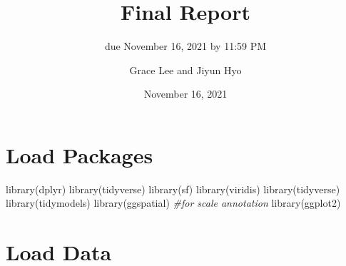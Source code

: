 \documentclass[
  11 pt,
]{article}
\title{Final Report}
\subtitle{due November 16, 2021 by 11:59 PM}
\author{Grace Lee and Jiyun Hyo}
\date{November 16, 2021}
\newenvironment{Shaded}{\begin{snugshade}}{\end{snugshade}}
\newcommand{\CommentTok}[1]{\textcolor[rgb]{0.56,0.35,0.01}{\textit{#1}}}
\newcommand{\FunctionTok}[1]{\textcolor[rgb]{0.00,0.00,0.00}{#1}}
\newcommand{\NormalTok}[1]{#1}
\begin{document}
\maketitle

\hypertarget{load-packages}{%
\section{Load Packages}\label{load-packages}}

\begin{Shaded}
\begin{Highlighting}[]
\FunctionTok{library}\NormalTok{(dplyr)}
\FunctionTok{library}\NormalTok{(tidyverse)}
\FunctionTok{library}\NormalTok{(sf)}
\FunctionTok{library}\NormalTok{(viridis)}
\FunctionTok{library}\NormalTok{(tidyverse)}
\FunctionTok{library}\NormalTok{(tidymodels)}
\FunctionTok{library}\NormalTok{(ggspatial) }\CommentTok{\#for scale annotation}
\FunctionTok{library}\NormalTok{(ggplot2)}
\end{Highlighting}
\end{Shaded}

\hypertarget{load-data}{%
\section{Load Data}\label{load-data}}
\end{document}
